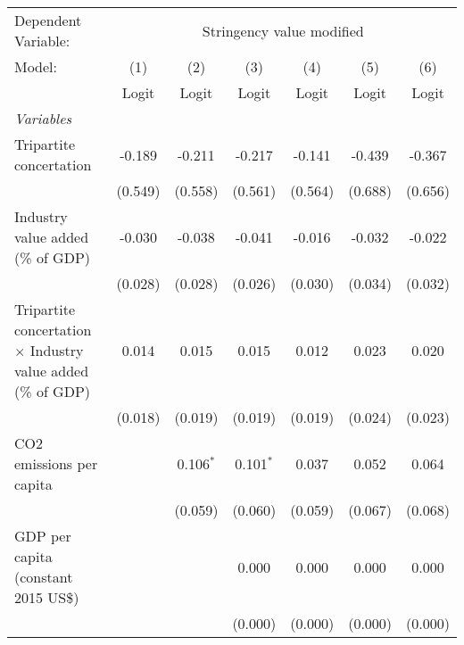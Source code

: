 
\begingroup
\centering
\begin{tabular}{lcccccc}
   \toprule
   Dependent Variable: & \multicolumn{6}{c}{Stringency value modified}\\
   Model:                                                              & (1)     & (2)         & (3)         & (4)           & (5)           & (6)\\  
                                                                       &  Logit  & Logit       & Logit       & Logit         & Logit         & Logit\\  
   \midrule
   \emph{Variables}\\
   Tripartite concertation                                             & -0.189  & -0.211      & -0.217      & -0.141        & -0.439        & -0.367\\   
                                                                       & (0.549) & (0.558)     & (0.561)     & (0.564)       & (0.688)       & (0.656)\\   
   Industry value added (\% of GDP)                                    & -0.030  & -0.038      & -0.041      & -0.016        & -0.032        & -0.022\\   
                                                                       & (0.028) & (0.028)     & (0.026)     & (0.030)       & (0.034)       & (0.032)\\   
   Tripartite concertation $\times$ Industry value added (\% of GDP)   & 0.014   & 0.015       & 0.015       & 0.012         & 0.023         & 0.020\\   
                                                                       & (0.018) & (0.019)     & (0.019)     & (0.019)       & (0.024)       & (0.023)\\   
   CO2 emissions per capita                                            &         & 0.106$^{*}$ & 0.101$^{*}$ & 0.037         & 0.052         & 0.064\\   
                                                                       &         & (0.059)     & (0.060)     & (0.059)       & (0.067)       & (0.068)\\   
   GDP per capita (constant 2015 US\$)                                 &         &             & 0.000       & 0.000         & 0.000         & 0.000\\   
                                                                       &         &             & (0.000)     & (0.000)       & (0.000)       & (0.000)\\   

\end{tabular}
